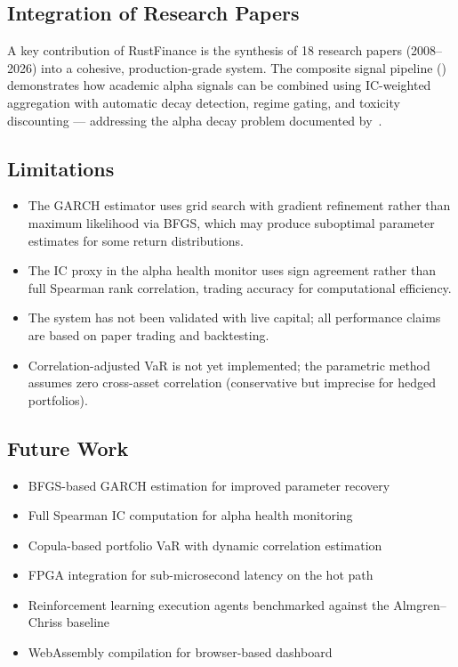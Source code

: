 \documentclass[11pt]{article}
\theoremstyle{definition}
\begin{document}
\subsection{Integration of Research Papers}

A key contribution of RustFinance is the synthesis of 18 research
papers (2008--2026) into a cohesive, production-grade system. The
composite signal pipeline () demonstrates how
academic alpha signals can be combined using IC-weighted aggregation
with automatic decay detection, regime gating, and toxicity
discounting --- addressing the alpha decay problem documented
by~\cite{alphaforge2026}.

\subsection{Limitations}

\begin{itemize}[leftmargin=*,topsep=2pt,itemsep=1pt]
  \item The GARCH estimator uses grid search with gradient refinement
        rather than maximum likelihood via BFGS, which may produce
        suboptimal parameter estimates for some return distributions.
  \item The IC proxy in the alpha health monitor uses sign agreement
        rather than full Spearman rank correlation, trading accuracy
        for computational efficiency.
  \item The system has not been validated with live capital; all
        performance claims are based on paper trading and backtesting.
  \item Correlation-adjusted VaR is not yet implemented; the
        parametric method assumes zero cross-asset correlation
        (conservative but imprecise for hedged portfolios).
\end{itemize}

\subsection{Future Work}

\begin{itemize}[leftmargin=*,topsep=2pt,itemsep=1pt]
  \item BFGS-based GARCH estimation for improved parameter recovery
  \item Full Spearman IC computation for alpha health monitoring
  \item Copula-based portfolio VaR with dynamic correlation estimation
  \item FPGA integration for sub-microsecond latency on the hot path
  \item Reinforcement learning execution agents benchmarked against
        the Almgren--Chriss baseline~\cite{ning2026}
  \item WebAssembly compilation for browser-based dashboard
\end{itemize}
\end{document}
